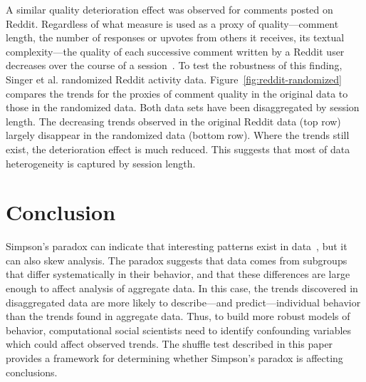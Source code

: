\documentclass{svjour3}
\begin{document}
A similar quality deterioration effect was observed for comments posted on Reddit. Regardless of what measure is used as a proxy of quality---comment length, the number of responses or upvotes from others it receives, its textual complexity---the quality of each successive comment written by a Reddit user decreases over the course of a session~\cite{Singer2016plosone}. To test the robustness of this finding, Singer et al. randomized Reddit activity data.
Figure~\ref{fig:reddit-randomized} compares the trends for the proxies of comment quality in the original data to those in the randomized data. Both data sets have been disaggregated by session length. %
The decreasing trends observed in the original Reddit data (top row) largely disappear in the randomized data (bottom row). Where the trends still exist, the deterioration effect is much reduced. This suggests that most of data heterogeneity is captured by session length.







\section{Conclusion}
Simpson's paradox can indicate that interesting patterns exist in data~\cite{fabris2000discovering}, but it can also skew analysis. The paradox suggests that data comes from subgroups that differ systematically in their behavior,  and that these differences are large enough to affect analysis of aggregate data. %
In this case, the trends discovered in disaggregated data are more likely to describe---and predict---individual behavior than the trends found in aggregate data. Thus, to build more robust models of behavior, computational social scientists need to identify confounding variables which could affect observed trends. The shuffle test described in this paper provides a framework for determining whether Simpson's paradox is affecting conclusions.



\end{document}
